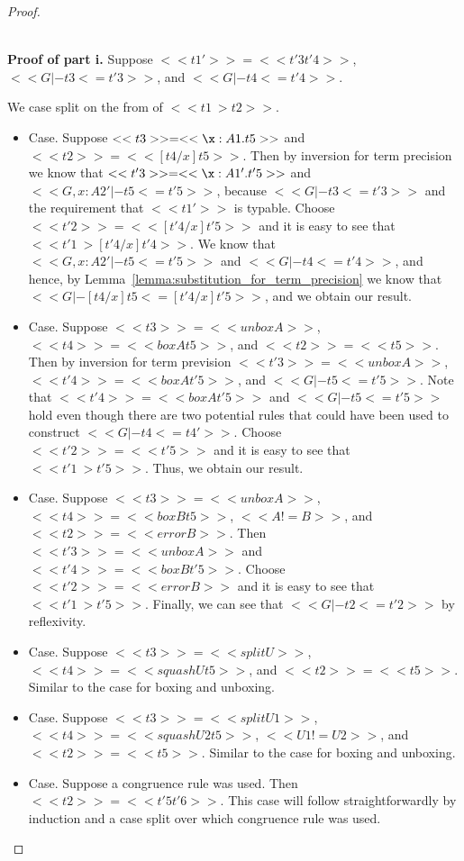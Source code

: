 \begin{proof}
\begin{itemize}
  \ \\
  \noindent
  \textbf{Proof of part i.}  Suppose $<<t1'>> = <<t'3 t'4>>$, $<<G |- t3 <= t'3>>$, and $<<G |- t4 <= t'4>>$.

  We case split on the from of $<<t1 ~> t2>>$.
  \begin{itemize}
  \item[] Case.  Suppose $<<t3>> = <<\x:A1.t5>>$ and $<<t2>> = << [t4/x]t5>>$.
    Then by inversion for term precision we know that
    $<<t'3>> = <<\x:A1'.t'5>>$ and $<<G, x : A2' |- t5 <= t'5>>$,
    because $<<G |- t3 <= t'3>>$ and the requirement that $<<t1'>>$ is typable. Choose $<<t'2>> = << [t'4/x]t'5>>$
    and it is easy to see that $<<t'1 ~> [t'4/x]t'4>>$.
    We know that $<<G, x : A2' |- t5 <= t'5>>$ and $<<G |- t4 <= t'4>>$, and hence,
    by Lemma~\ref{lemma:substitution_for_term_precision} we know that
    $<<G |- [t4/x]t5 <= [t'4/x]t'5>>$, and we obtain our result.
    
  \item[] Case.  Suppose $<<t3>> = <<unbox A>>$, $<<t4>> = <<box A t5>>$, and $<<t2>> = <<t5>>$.
    Then by inversion for term prevision $<<t'3>> = <<unbox A>>$, $<<t'4>> = <<box A t'5>>$, and $<<G |- t5 <= t'5>>$.
    Note that $<<t'4>> = <<box A t'5>>$ and $<<G |- t5 <= t'5>>$ hold even though there are two potential rules
    that could have been used to construct $<<G |- t4 <= t4'>>$. 
    Choose $<<t'2>> = <<t'5>>$ and it is easy to see that $<<t'1 ~> t'5>>$.  Thus, we obtain our result.    

  \item[] Case.  Suppose $<<t3>> = <<unbox A>>$, $<<t4>> = <<box B t5>>$, $<<A != B>>$,
    and $<<t2>> = <<error B>>$.  Then $<<t'3>> = <<unbox A>>$ and $<<t'4>> = <<box B t'5>>$.
    Choose $<<t'2>> = <<error B>>$ and it is easy to see that $<<t'1 ~> t'5>>$.  Finally,
    we can see that $<<G |- t2 <= t'2>>$ by reflexivity.
    
  \item[] Case.  Suppose $<<t3>> = <<split U>>$, $<<t4>> = <<squash U t5>>$, and $<<t2>> = <<t5>>$.
    Similar to the case for boxing and unboxing.
    
  \item[] Case.  Suppose $<<t3>> = <<split U1>>$, $<<t4>> = <<squash U2 t5>>$, $<<U1 != U2>>$, and $<<t2>> = <<t5>>$.
    Similar to the case for boxing and unboxing.

  \item[] Case. Suppose a congruence rule was used.  Then $<<t2>> = <<t'5 t'6>>$.
    This case will follow straightforwardly by induction and a case split over which congruence rule was used.
  \end{itemize}


\end{itemize}
\end{proof}
